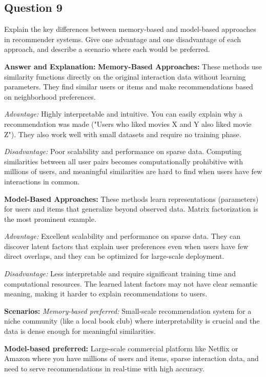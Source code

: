 \documentclass[11pt]{article}
\newenvironment{answer}{\color{answercolor}\begin{framed}\textbf{Answer and Explanation:}}{\end{framed}}
\begin{document}
\subsection{Question 9}
Explain the key differences between memory-based and model-based approaches in recommender systems. Give one advantage and one disadvantage of each approach, and describe a scenario where each would be preferred.

\begin{answer}
\textbf{Memory-Based Approaches:}
These methods use similarity functions directly on the original interaction data without learning parameters. They find similar users or items and make recommendations based on neighborhood preferences.

\textit{Advantage:} Highly interpretable and intuitive. You can easily explain why a recommendation was made ("Users who liked movies X and Y also liked movie Z"). They also work well with small datasets and require no training phase.

\textit{Disadvantage:} Poor scalability and performance on sparse data. Computing similarities between all user pairs becomes computationally prohibitive with millions of users, and meaningful similarities are hard to find when users have few interactions in common.

\textbf{Model-Based Approaches:}
These methods learn representations (parameters) for users and items that generalize beyond observed data. Matrix factorization is the most prominent example.

\textit{Advantage:} Excellent scalability and performance on sparse data. They can discover latent factors that explain user preferences even when users have few direct overlaps, and they can be optimized for large-scale deployment.

\textit{Disadvantage:} Less interpretable and require significant training time and computational resources. The learned latent factors may not have clear semantic meaning, making it harder to explain recommendations to users.

\textbf{Scenarios:}
\textit{Memory-based preferred:} Small-scale recommendation system for a niche community (like a local book club) where interpretability is crucial and the data is dense enough for meaningful similarities.

\textbf{Model-based preferred:} Large-scale commercial platform like Netflix or Amazon where you have millions of users and items, sparse interaction data, and need to serve recommendations in real-time with high accuracy.
\end{answer}
\end{document}
